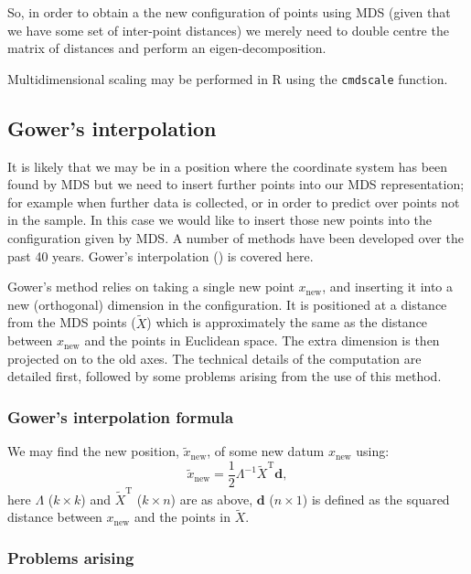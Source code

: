 \documentclass[a4paper,10pt]{article}
\newcommand{\tr}[1]{#1^{\text{T}}}
\newcommand{\cross}{\times}
\begin{document}
So, in order to obtain a the new configuration of points using MDS (given that we have some set of inter-point distances) we merely need to double centre the matrix of distances and perform an eigen-decomposition.

Multidimensional scaling may be performed in \textsf{R} using the \texttt{cmdscale} function. 

\subsection{Gower's interpolation} 

It is likely that we may be in a position where the coordinate system has been found by MDS but we need to insert further points into our MDS representation; for example when further data is collected, or in order to predict over points not in the sample. In this case we would like to insert those new points into the configuration given by MDS. A number of methods have been developed over the past 40 years. Gower's interpolation (\cite{gower1968}) is covered here.

Gower's method relies on taking a single new point $x_{\text{new}}$, and inserting it into a new (orthogonal) dimension in the configuration. It is positioned at a distance from the MDS points ($\tilde{X}$) which is approximately the same as the distance between $x_{\text{new}}$ and the points in Euclidean space. The extra dimension is then projected on to the old axes. The technical details of the computation are detailed first, followed by some problems arising from the use of this method. 

\subsubsection{Gower's interpolation formula}

We may find the new position, $\tilde{x}_{\text{new}}$, of some new datum $x_{\text{new}}$ using:
\begin{equation}
\tilde{x}_{\text{new}} = \frac{1}{2} \Lambda^{-1} \tr{\tilde{X}} \mathbf{d},
\label{gower}
\end{equation}
here $\Lambda$ ($k \cross k$) and $\tr{\tilde{X}}$ ($k \cross n$) are as above, $\mathbf{d}$ ($n \cross 1$) is defined as the squared distance between $x_{\text{new}}$ and the points in $\tilde{X}$.


\subsubsection{Problems arising}
\end{document}
